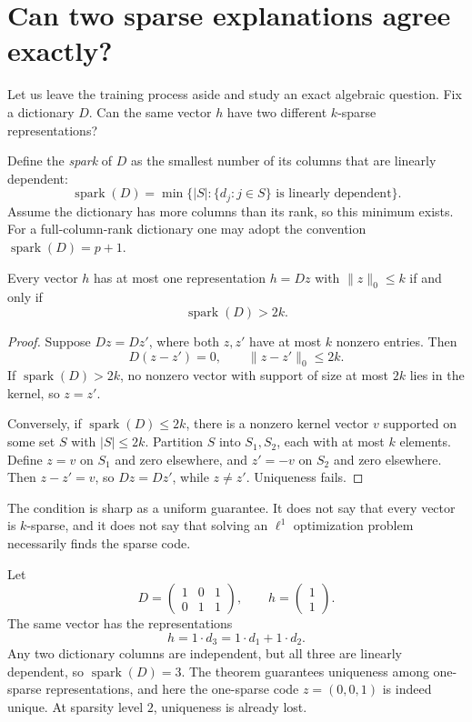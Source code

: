 \section{Can two sparse explanations agree exactly?}

Let us leave the training process aside and study an exact algebraic question. Fix a dictionary \(D\). Can the same vector \(h\) have two different \(k\)-sparse representations?

Define the \emph{spark} of \(D\) as the smallest number of its columns that are linearly dependent:
\[
 \operatorname{spark}(D)
 =\min\{|S|:\{d_j:j\in S\}
                \text{ is linearly dependent}\}.
\]
Assume the dictionary has more columns than its rank, so this minimum exists. For a full-column-rank dictionary one may adopt the convention \(\operatorname{spark}(D)=p+1\).

\begin{theorem}
Every vector \(h\) has at most one representation \(h=Dz\) with \(\|z\|_0\leq k\) if and only if
\begin{equation}
 \operatorname{spark}(D)>2k.
 \label{eq:N20261009-spark}
\end{equation}
\end{theorem}
\begin{proof}
Suppose \(Dz=Dz'\), where both \(z,z'\) have at most \(k\) nonzero entries. Then
\[
 D(z-z')=0,\qquad\|z-z'\|_0\leq2k.
\]
If \(\operatorname{spark}(D)>2k\), no nonzero vector with support of size at most \(2k\) lies in the kernel, so \(z=z'\).

Conversely, if \(\operatorname{spark}(D)\leq2k\), there is a nonzero kernel vector \(v\) supported on some set \(S\) with \(|S|\leq2k\). Partition \(S\) into \(S_1,S_2\), each with at most \(k\) elements. Define \(z=v\) on \(S_1\) and zero elsewhere, and \(z'=-v\) on \(S_2\) and zero elsewhere. Then \(z-z'=v\), so \(Dz=Dz'\), while \(z\ne z'\). Uniqueness fails.
\end{proof}

The condition is sharp as a uniform guarantee. It does not say that every vector is \(k\)-sparse, and it does not say that solving an \(\ell^1\) optimization problem necessarily finds the sparse code.

\begin{example}
Let
\[
 D=
 \begin{pmatrix}
 1&0&1\\
 0&1&1
 \end{pmatrix},
 \qquad h=\begin{pmatrix}1\\1\end{pmatrix}.
\]
The same vector has the representations
\[
 h=1\cdot d_3
  =1\cdot d_1+1\cdot d_2.
\]
Any two dictionary columns are independent, but all three are linearly dependent, so \(\operatorname{spark}(D)=3\). The theorem guarantees uniqueness among one-sparse representations, and here the one-sparse code \(z=(0,0,1)\) is indeed unique. At sparsity level \(2\), uniqueness is already lost.
\end{example}

